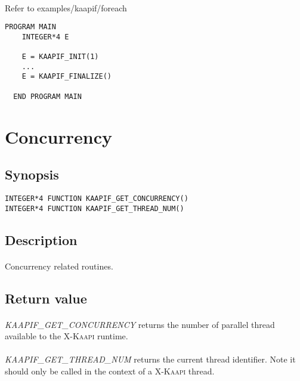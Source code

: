 \documentclass[a4paper, 11pt]{article}
\newcommand{\kaapi}{\textsc{X-Kaapi}\xspace}
\begin{document}
\paragraph{}
Refer to examples/kaapif/foreach\\
\begin{small}
\begin{lstlisting}[frame=tb]
  PROGRAM MAIN
    INTEGER*4 E

    E = KAAPIF_INIT(1)
    ...
    E = KAAPIF_FINALIZE()

  END PROGRAM MAIN
\end{lstlisting}
\end{small}


\newpage
\section{Concurrency}

\subsection{Synopsis}
\begin{small}
\lstset{language=C}
\begin{lstlisting}[frame=tb]
INTEGER*4 FUNCTION KAAPIF_GET_CONCURRENCY()
INTEGER*4 FUNCTION KAAPIF_GET_THREAD_NUM()
\end{lstlisting}
\end{small}

\subsection{Description}
\paragraph{}
Concurrency related routines.

\subsection{Return value}
\paragraph{}
\textit{KAAPIF\_GET\_CONCURRENCY} returns the number of parallel thread available
to the \kaapi runtime.
\paragraph{}
\textit{KAAPIF\_GET\_THREAD\_NUM} returns the current thread identifier. Note it
should only be called in the context of a \kaapi thread.
\end{document}
